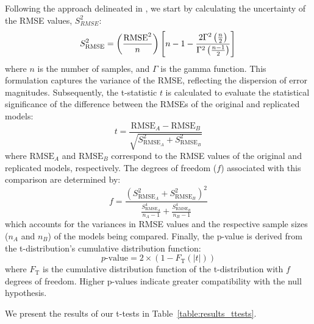 Following the approach delineated in \citet{andersonImprovedAccuracyQuantitative2017}, we start by calculating the uncertainty of the RMSE values, $S_{RMSE}^2$:
$$
S_{\text{RMSE}}^2 = \left(\frac{\text{RMSE}^2}{n}\right) \left[n - 1 - \frac{2\Gamma^2\left(\frac{n}{2}\right)}{\Gamma^2\left(\frac{n - 1}{2}\right)}\right] \\
$$
where $n$ is the number of samples, and $\Gamma$ is the gamma function. This formulation captures the variance of the RMSE, reflecting the dispersion of error magnitudes.
Subsequently, the t-statistic $t$ is calculated to evaluate the statistical significance of the difference between the RMSEs of the original and replicated models:
$$
t = \frac{\text{RMSE}_A - \text{RMSE}_B}{\sqrt{S_{\text{RMSE}_A}^2 + S_{\text{RMSE}_B}^2}}
$$
where $\text{RMSE}_A$ and $\text{RMSE}_B$ correspond to the RMSE values of the original and replicated models, respectively.
The degrees of freedom ($f$) associated with this comparison are determined by:
$$
f = \frac{\left(S_{\text{RMSE}_A}^2 + S_{\text{RMSE}_B}^2\right)^2}{\frac{S^4_{\text{RMSE}_A}}{n_A - 1} + \frac{S^4_{\text{RMSE}_B}}{n_B - 1}}
$$
which accounts for the variances in RMSE values and the respective sample sizes ($n_A$ and $n_B$) of the models being compared.
Finally, the p-value is derived from the t-distribution's cumulative distribution function:
$$p\text{-value} = 2 \times \left(1 - F_{\text{T}}(|t|)\right)$$
where $F_{\text{T}}$ is the cumulative distribution function of the t-distribution with $f$ degrees of freedom.
Higher p-values indicate greater compatibility with the null hypothesis.

We present the results of our t-tests in Table~\ref{table:results_ttests}.

